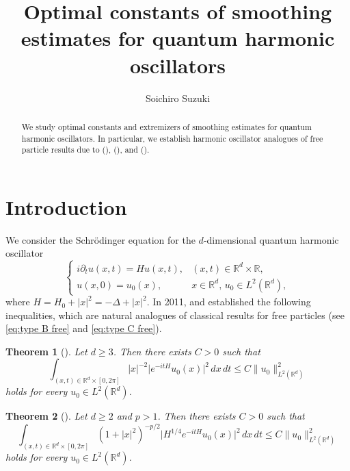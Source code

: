 \documentclass[reqno]{amsart}
\title[Optimal smoothing estimates for quantum harmonic oscillators]{Optimal constants of smoothing estimates for quantum harmonic oscillators}
\date{}
\author{Soichiro Suzuki}
\theoremstyle{plain}
\newtheorem{theorem}{Theorem}[section]
\numberwithin{equation}{section}
\theoremstyle{remark}
\newcommand{\R}{\mathbb{R}}
\newcommand{\abs}[1]{\lvert#1\rvert}
\newcommand{\norm}[1]{\lVert#1\rVert}
\newcommand{\Hamiltonian}{H}
\newcommand{\Hamiltonianfree}{\Hamiltonian_0}
\newcommand{\Laplacian}{\Delta}
\begin{document}
		\begin{abstract}
We study optimal constants and extremizers of smoothing estimates for quantum harmonic oscillators.
In particular, we establish harmonic oscillator analogues of free particle results due to \citeauthor{Sim1992} (\citeyear{Sim1992}), \citeauthor{BS2014} (\citeyear{BS2014}), and \citeauthor{BSS2015} (\citeyear{BSS2015}).
	\end{abstract}
	\maketitle
\section{Introduction}
We consider the Schr\"{o}dinger equation for the $d$-dimensional quantum harmonic oscillator
\begin{equation} \label{eq:Schrodinger}
	\begin{cases}
		i \partial_t u(x, t) = \Hamiltonian u(x, t) , & (x, t) \in \R^d \times \R , \\
		u(x, 0) = u_0(x) , & x \in \R^d , \, u_0 \in L^2(\R^d), 
	\end{cases}
\end{equation}
where $\Hamiltonian = \Hamiltonianfree + \abs{x}^2 = - \Laplacian + \abs{x}^2$. 
In 2011, \citet{Che2011} and \citet{BR2011} established the following inequalities, which are natural analogues of classical results for free particles (see \eqref{eq:type B free} and \eqref{eq:type C free}). 
\begin{theorem}[{\cite[Theorem 1]{Che2011}}] \label{thm:Chen}
	Let $d \geq 3$. Then there exists $C > 0$ such that
	\begin{equation} \label{eq:type B HO}
		\int_{(x, t) \in \R^d \times [0, 2 \pi]} \abs{x}^{-2} \abs{  e^{- i t \Hamiltonian} u_0(x) }^2 \, dx \, dt \leq C \norm{ u_0 }_{L^2(\R^d)}^2 
	\end{equation}
	holds for every $u_0 \in L^2(\R^d)$.
\end{theorem}
\begin{theorem}[{\cite[Theorem 3.3]{BR2011}}] \label{thm:BR}
	Let $d \geq 2$ and $p > 1$. Then there exists $C > 0$ such that
	\begin{equation} \label{eq:type C HO}
		\int_{(x, t) \in \R^d \times [0, 2 \pi]} (1 + \abs{x}^2)^{-p/2} \abs{ \Hamiltonian^{1/4} e^{- i t \Hamiltonian} u_0(x) }^2 \, dx \, dt \leq C \norm{ u_0 }_{L^2(\R^d)}^2 
	\end{equation}
	holds for every $u_0 \in L^2(\R^d)$.
\end{theorem}
\end{document}
